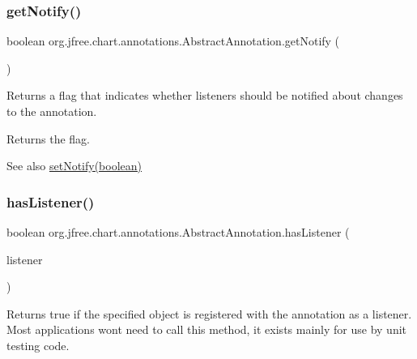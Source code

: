 \subsubsection{\texorpdfstring{get\+Notify()}{getNotify()}}
{\footnotesize\ttfamily boolean org.\+jfree.\+chart.\+annotations.\+Abstract\+Annotation.\+get\+Notify (\begin{DoxyParamCaption}{ }\end{DoxyParamCaption})}

Returns a flag that indicates whether listeners should be notified about changes to the annotation.

\begin{DoxyReturn}{Returns}
the flag.
\end{DoxyReturn}
\begin{DoxySeeAlso}{See also}
\mbox{\hyperlink{classorg_1_1jfree_1_1chart_1_1annotations_1_1_abstract_annotation_ab7788a521170bcce474868752965b910}{set\+Notify(boolean)}} 
\end{DoxySeeAlso}
\mbox{\label{classorg_1_1jfree_1_1chart_1_1annotations_1_1_abstract_annotation_a3b5581a6fdb861b037ceaabd7cb1bc8a}} 
\subsubsection{\texorpdfstring{has\+Listener()}{hasListener()}}
{\footnotesize\ttfamily boolean org.\+jfree.\+chart.\+annotations.\+Abstract\+Annotation.\+has\+Listener (\begin{DoxyParamCaption}\item[{Event\+Listener}]{listener }\end{DoxyParamCaption})}

Returns {\ttfamily true} if the specified object is registered with the annotation as a listener. Most applications won\textquotesingle{}t need to call this method, it exists mainly for use by unit testing code.


